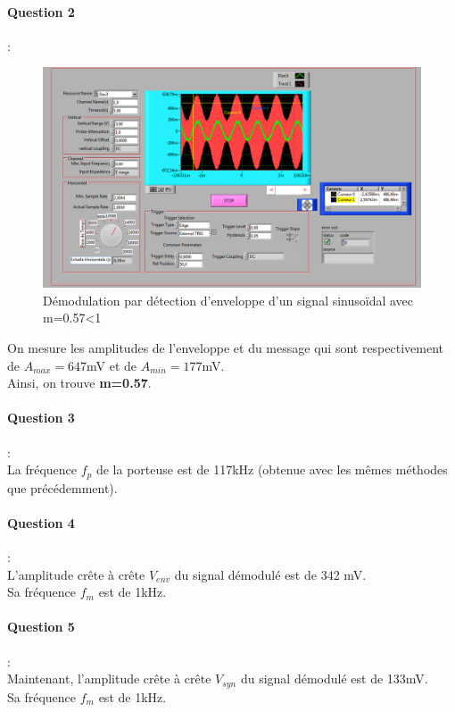 \documentclass[french]{article}
\begin{document}
\paragraph{Question 2} : \\
\begin{figure}[!h]
\includegraphics[width=\textwidth]{bonjour.png}
\caption{Démodulation par détection d'enveloppe d'un signal sinusoïdal avec m=0.57<1 }
\end{figure}

On mesure les amplitudes de l'enveloppe et du message qui sont respectivement de $A_{max}=647$mV et de $A_{min}=177$mV. \\
Ainsi, on trouve \textbf{m=0.57}.

\paragraph{Question 3} : \\
La fréquence $f_{p}$ de la porteuse est de 117kHz (obtenue avec les mêmes méthodes que précédemment).
\paragraph{Question 4} : \\
L'amplitude crête à crête $V_{env}$ du signal démodulé est de 342 mV.\\
Sa fréquence $f_{m}$ est de 1kHz.
\paragraph{Question 5} : \\
Maintenant, l'amplitude crête à crête $V_{syn}$ du signal démodulé est de 133mV.\\
Sa fréquence $f_{m}$ est de 1kHz.
\end{document}
